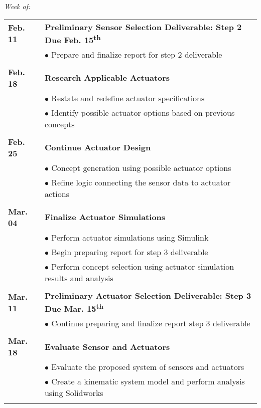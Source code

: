 \documentclass[12pt]{article}
\newcommand{\ts}{\textsuperscript}
\begin{document}
\begin{flushleft}
\textit{Week of:}

\begin{tabular}{l | l}


 
\textbf{Feb. 11} &\textbf{Preliminary Sensor Selection Deliverable: Step 2 Due Feb. 15\ts{th}}\\
 & $\bullet$ Prepare and finalize report for step 2 deliverable\\\\
 
\textbf{Feb. 18} &\textbf{Research Applicable Actuators}\\
 & $\bullet$ Restate and redefine actuator specifications\\
  & $\bullet$ Identify possible actuator options based on previous concepts\\\\
  
\textbf{Feb. 25} & \textbf{Continue Actuator Design}\\
 & $\bullet$ Concept generation using possible actuator options\\
  & $\bullet$ Refine logic connecting the sensor data to actuator actions\\\\
  
\textbf{Mar. 04} & \textbf{Finalize Actuator Simulations}\\
 & $\bullet$ Perform actuator simulations using Simulink\\
 & $\bullet$ Begin preparing report for step 3 deliverable\\
 & $\bullet$ Perform concept selection using actuator simulation results and analysis\\\\
 
\textbf{Mar. 11} &\textbf{Preliminary Actuator Selection Deliverable: Step 3 Due Mar. 15\ts{th}}\\
 & $\bullet$ Continue preparing and finalize report step 3 deliverable\\\\
 
\textbf{Mar. 18} & \textbf{Evaluate Sensor and Actuators}\\
 & $\bullet$ Evaluate the proposed system of sensors and actuators\\
  & $\bullet$ Create a kinematic system model and perform analysis using Solidworks\\\\
  

\end{tabular}
\end{flushleft}
\end{document}
